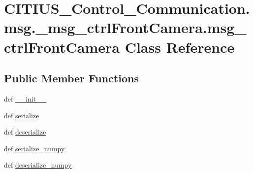 \hypertarget{class_c_i_t_i_u_s___control___communication_1_1msg_1_1__msg__ctrl_front_camera_1_1msg__ctrl_front_camera}{\section{\-C\-I\-T\-I\-U\-S\-\_\-\-Control\-\_\-\-Communication.\-msg.\-\_\-msg\-\_\-ctrl\-Front\-Camera.\-msg\-\_\-ctrl\-Front\-Camera \-Class \-Reference}
\label{class_c_i_t_i_u_s___control___communication_1_1msg_1_1__msg__ctrl_front_camera_1_1msg__ctrl_front_camera}
}
\subsection*{\-Public \-Member \-Functions}
\begin{DoxyCompactItemize}
\item 
def \hyperlink{class_c_i_t_i_u_s___control___communication_1_1msg_1_1__msg__ctrl_front_camera_1_1msg__ctrl_front_camera_a84a7cd06cbb3d9d9e3982f582a42bfa6}{\-\_\-\-\_\-init\-\_\-\-\_\-}
\item 
def \hyperlink{class_c_i_t_i_u_s___control___communication_1_1msg_1_1__msg__ctrl_front_camera_1_1msg__ctrl_front_camera_af87f955dc0bba28cbede5a3d276b1fb4}{serialize}
\item 
def \hyperlink{class_c_i_t_i_u_s___control___communication_1_1msg_1_1__msg__ctrl_front_camera_1_1msg__ctrl_front_camera_a822240edcb5e5f72751884b2ca7d7d69}{deserialize}
\item 
def \hyperlink{class_c_i_t_i_u_s___control___communication_1_1msg_1_1__msg__ctrl_front_camera_1_1msg__ctrl_front_camera_aab08a33576b340e45f7685118e1be03d}{serialize\-\_\-numpy}
\item 
def \hyperlink{class_c_i_t_i_u_s___control___communication_1_1msg_1_1__msg__ctrl_front_camera_1_1msg__ctrl_front_camera_aeed12a3eedbe81bc9ad659ad0156d7d4}{deserialize\-\_\-numpy}
\end{DoxyCompactItemize}
